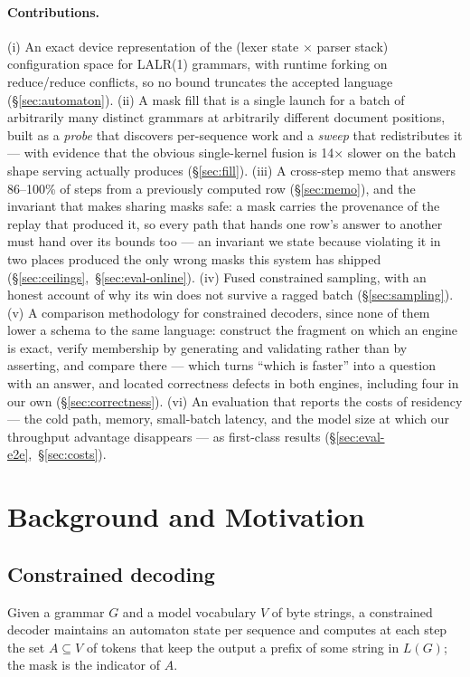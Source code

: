 \documentclass{article}
\begin{document}
\paragraph{Contributions.} (i) An exact device representation of the (lexer
state $\times$ parser stack) configuration space for LALR(1) grammars, with
runtime forking on reduce/reduce conflicts, so no bound truncates the accepted
language (\S\ref{sec:automaton}). (ii) A mask fill that is a single launch for
a batch of arbitrarily many distinct grammars at arbitrarily different document
positions, built as a \emph{probe} that discovers per-sequence work and a
\emph{sweep} that redistributes it --- with evidence that the obvious
single-kernel fusion is 14$\times$ slower on the batch shape serving actually
produces (\S\ref{sec:fill}). (iii) A cross-step memo that answers 86--100\% of
steps from a previously computed row (\S\ref{sec:memo}), and the invariant that
makes sharing masks safe: a mask carries the provenance of the replay that
produced it, so every path that hands one row's answer to another must hand
over its bounds too --- an invariant we state because violating it in two
places produced the only wrong masks this system has shipped
(\S\ref{sec:ceilings},~\S\ref{sec:eval-online}). (iv) Fused
constrained sampling, with an honest account of why its win does not survive a
ragged batch (\S\ref{sec:sampling}). (v) A comparison methodology for
constrained decoders, since none of them lower a schema to the same language:
construct the fragment on which an engine is exact, verify membership by
generating and validating rather than by asserting, and compare there --- which
turns ``which is faster'' into a question with an answer, and located
correctness defects in both engines, including four in our own
(\S\ref{sec:correctness}). (vi) An evaluation that reports the costs of
residency --- the cold path, memory, small-batch latency, and the model size at
which our throughput advantage disappears --- as first-class results
(\S\ref{sec:eval-e2e},~\S\ref{sec:costs}).

\section{Background and Motivation}
\label{sec:background}

\subsection{Constrained decoding}

Given a grammar $G$ and a model vocabulary $V$ of byte strings, a constrained
decoder maintains an automaton state per sequence and computes at each step the
set $A \subseteq V$ of tokens that keep the output a prefix of some string in
$L(G)$; the mask is the indicator of $A$.
\end{document}
